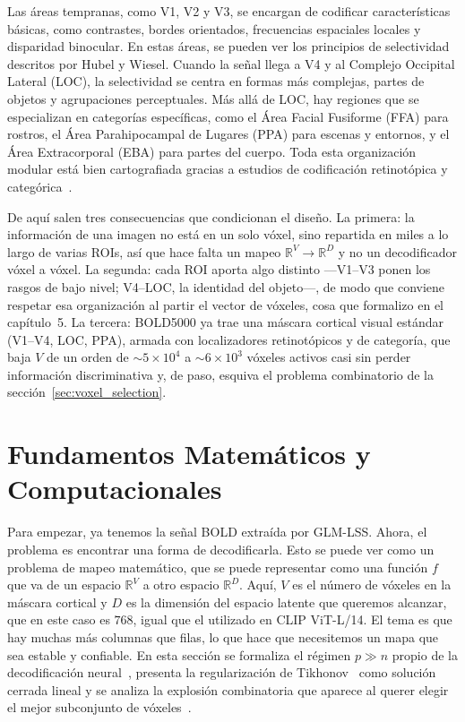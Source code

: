 Las áreas tempranas, como V1, V2 y V3, se encargan de codificar características básicas,
como contrastes, bordes orientados, frecuencias espaciales locales y disparidad binocular.
En estas áreas, se pueden ver los principios de selectividad descritos por Hubel y Wiesel.
Cuando la señal llega a V4 y al Complejo Occipital Lateral (LOC), la selectividad se
centra en formas más complejas, partes de objetos y agrupaciones perceptuales.
Más allá de LOC, hay regiones que se especializan en categorías específicas, como
el Área Facial Fusiforme (FFA) para rostros, el Área Parahipocampal de Lugares (PPA)
para escenas y entornos, y el Área Extracorporal (EBA) para partes del cuerpo. Toda esta organización modular está bien cartografiada gracias a estudios de 
codificación retinotópica y categórica~\cite{kay2008identifying,naselaris2011encoding,huth2012continuous,kriegeskorte2008representational}.

De aquí salen tres consecuencias que condicionan el diseño. La primera: la información de una 
imagen no está en un solo vóxel, sino repartida en miles a lo largo de varias ROIs, así que 
hace falta un mapeo $\mathbb{R}^V \rightarrow \mathbb{R}^D$ y no un decodificador vóxel a vóxel. 
La segunda: cada ROI aporta algo distinto ---V1--V3 ponen los rasgos de bajo nivel; V4--LOC, la 
identidad del objeto---, de modo que conviene respetar esa organización al partir el vector de 
vóxeles, cosa que formalizo en el capítulo~5. La tercera: BOLD5000 ya trae una máscara cortical 
visual estándar (V1--V4, LOC, PPA), armada con localizadores retinotópicos y de categoría, que 
baja $V$ de un orden de $\sim 5\!\times\!10^{4}$ a $\sim 6\!\times\!10^{3}$ vóxeles activos 
casi sin perder información discriminativa y, de paso, esquiva el problema combinatorio de la 
sección~\ref{sec:voxel_selection}.

\section{Fundamentos Matemáticos y Computacionales}

Para empezar, ya tenemos la señal BOLD extraída por GLM-LSS. Ahora, el problema es encontrar una forma de decodificarla. Esto se puede ver como un problema de mapeo matemático, que se puede representar como una función $f$ que va de un espacio $\mathbb{R}^V$ a otro espacio $\mathbb{R}^D$. Aquí, $V$ es el número de vóxeles en la máscara cortical y $D$ es la dimensión del espacio latente que queremos alcanzar, que en este caso es $768$, igual que el utilizado en CLIP ViT-L/14.
El tema es que hay muchas más columnas que filas, lo que hace que necesitemos un mapa que sea estable y confiable.
En esta sección se formaliza el régimen $p\!\gg\!n$ propio de la decodificación neural~\cite{hastie2009elements}, 
presenta la regularización de Tikhonov~\cite{tikhonov1977solutions} como solución cerrada 
lineal y se analiza la explosión combinatoria que aparece al querer elegir el mejor subconjunto de 
vóxeles~\cite{garey1979computers}.

